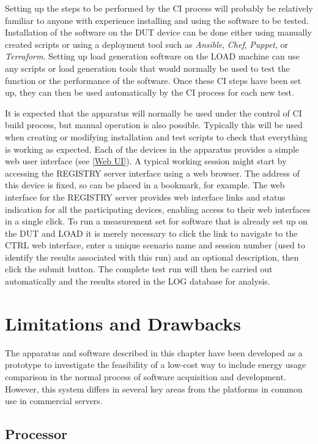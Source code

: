 Setting up the steps to be performed by the CI process will probably be relatively familiar to anyone with experience installing and using the software to be tested. Installation of the software on the DUT device can be done either using manually created scripts or using a deployment tool such as \emph{Ansible}, \emph{Chef}, \emph{Puppet}, or \emph{Terraform}. Setting up load generation software on the LOAD machine can use any scripts or load generation tools that would normally be used to test the function or the performance of the software. Once these CI steps have been set up, they can then be used automatically by the CI process for each new test.

It is expected that the apparatus will normally be used under the control of CI build process, but manual operation is also possible. Typically this will be used when creating or modifying installation and test scripts to check that everything is working as expected. Each of the devices in the apparatus provides a simple web user interface (see \autoref{Web UI}). A typical working session might start by accessing the REGISTRY server interface using a web browser. The address of this device is fixed, so can be placed in a bookmark, for example. The web interface for the REGISTRY server provides web interface links and status indication for all the participating devices, enabling access to their web interfaces in a single click. To run a measurement set for software that is already set up on the DUT and LOAD it is merely necessary to click the link to navigate to the CTRL web interface, enter a unique scenario name and session number (used to identify the results associated with this run) and an optional description, then click the submit button. The complete test run will then be carried out automatically and the results stored in the LOG database for analysis.

\section{Limitations and Drawbacks}
\label{testrig:limitations}

The apparatus and software described in this chapter have been developed as a prototype to investigate the feasibility of a low-cost way to include energy usage comparison in the normal process of software acquisition and development. However, this system differs in several key areas from the platforms in common use in commercial servers.

\subsection{Processor}

